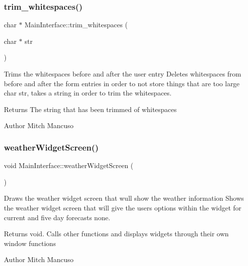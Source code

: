 \subsubsection{\texorpdfstring{trim\+\_\+whitespaces()}{trim\_whitespaces()}}
{\footnotesize\ttfamily char $\ast$ Main\+Interface\+::trim\+\_\+whitespaces (\begin{DoxyParamCaption}\item[{char $\ast$}]{str }\end{DoxyParamCaption})}



Trims the whitespaces before and after the user entry  Deletes whitespaces from before and after the form entries in order to not store things that are too large  char str, takes a string in order to trim the whitespaces. 

\begin{DoxyReturn}{Returns}
The string that has been trimmed of whitespaces 
\end{DoxyReturn}
\begin{DoxyAuthor}{Author}
Mitch Mancuso 
\end{DoxyAuthor}
\mbox{\label{class_main_interface_ae72bd29c04edb558852887aef9d91ccf}} 
\subsubsection{\texorpdfstring{weather\+Widget\+Screen()}{weatherWidgetScreen()}}
{\footnotesize\ttfamily void Main\+Interface\+::weather\+Widget\+Screen (\begin{DoxyParamCaption}{ }\end{DoxyParamCaption})}



Draws the weather widget screen that wull show the weather information  Shows the weather widget screen that will give the users options within the widget for current and five day forecasts  none. 

\begin{DoxyReturn}{Returns}
void. Calls other functions and displays widgets through their own window functions 
\end{DoxyReturn}
\begin{DoxyAuthor}{Author}
Mitch Mancuso 
\end{DoxyAuthor}
\mbox{\label{class_main_interface_a8d6a94e88513e86f5dcbadf741bcac8b}} 
